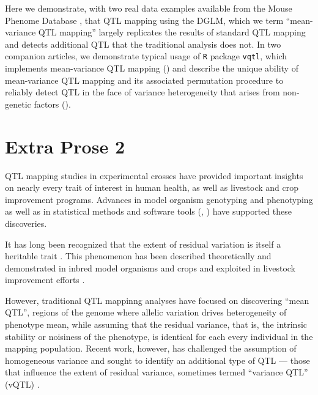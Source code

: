     Here we demonstrate, with two real data examples available from the Mouse Phenome Database \citep{Bogue2015}, that QTL mapping using the DGLM, which we term ``mean-variance QTL mapping'' largely replicates the results of standard QTL mapping and detects additional QTL that the traditional analysis does not.
    In two companion articles, we demonstrate typical usage of \texttt{R} package \texttt{vqtl}, which implements mean-variance QTL mapping  (\CortyRPaper) and 
    describe the unique ability of mean-variance QTL mapping and its associated permutation procedure to reliably detect QTL in the face of variance heterogeneity that arises from non-genetic factors (\CortyMethodsPaper).


\section{Extra Prose 2}

QTL mapping studies in experimental crosses have provided important insights on nearly every trait of interest in human health, as well as livestock and crop improvement programs.
Advances in model organism genotyping \citep{Williams1990} and phenotyping \citep{Yang2014a} as well as in statistical methods \citep{Lander1989a,Martinez1992} and software tools (\eg, \citealt{Broman2003,Mulligan2017}) have supported these discoveries.

It has long been recognized that the extent of residual variation is itself a heritable trait \citep{Falconer1965,Lynch1998}.
This phenomenon has been described theoretically \citep{Hill2004-uo,Hill2010} and demonstrated in inbred model organisms \citep{Sorensen2015,Ayroles2015} and crops \citep{Yang2012-aw,Forsberg2015} and exploited in livestock improvement efforts \citep{Mulder2008,Ibanez-Escriche2008-ie}.

However, traditional QTL mappinng analyses have focused on discovering ``mean QTL'', regions of the genome where allelic variation drives heterogeneity of phenotype mean, while assuming that the residual variance, that is, the intrinsic stability or noisiness of the phenotype, is identical for each every individual in the mapping population.
Recent work, however, has challenged the assumption of homogeneous variance and sought to identify an additional type of QTL --- those that
influence the extent of residual variance, sometimes termed ``variance QTL'' (vQTL) \citep{Pare2010,Ronnegard2011a,Ronnegard2012,Cao2014}.

